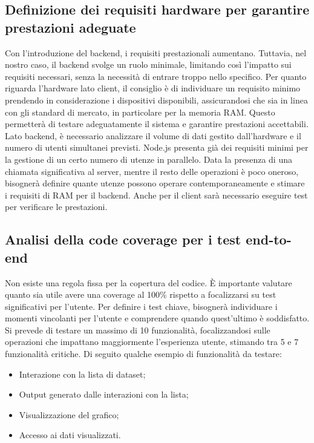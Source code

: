 \subsection{Definizione dei requisiti hardware per garantire prestazioni adeguate}
Con l'introduzione del backend, i requisiti prestazionali aumentano. Tuttavia, nel nostro caso, il backend svolge un ruolo minimale, limitando così l'impatto sui requisiti necessari, senza la necessità di entrare troppo nello specifico.
Per quanto riguarda l'hardware lato client, il consiglio è di individuare un requisito minimo prendendo in considerazione i dispositivi disponibili, assicurandosi che sia in linea con gli standard di mercato, in particolare per la memoria RAM. Questo permetterà di testare adeguatamente il sistema e garantire prestazioni accettabili.
Lato backend, è necessario analizzare il volume di dati gestito dall'hardware e il numero di utenti simultanei previsti. Node.js presenta già dei requisiti minimi per la gestione di un certo numero di utenze in parallelo. Data la presenza di una chiamata significativa al server, mentre il resto delle operazioni è poco oneroso, bisognerà definire quante utenze possono operare contemporaneamente e stimare i requisiti di RAM per il backend. Anche per il client sarà necessario eseguire test per verificare le prestazioni.

\subsection{Analisi della code coverage per i test end-to-end}
Non esiste una regola fissa per la copertura del codice. È importante valutare quanto sia utile avere una coverage al 100\% rispetto a focalizzarsi su test significativi per l'utente.
Per definire i test chiave, bisognerà individuare i momenti vincolanti per l'utente e comprendere quando quest'ultimo è soddisfatto. Si prevede di testare un massimo di 10 funzionalità, focalizzandosi sulle operazioni che impattano maggiormente l'esperienza utente, stimando tra 5 e 7 funzionalità critiche.
Di seguito qualche esempio di funzionalità da testare:
\begin{itemize}
\item Interazione con la lista di dataset;
\item Output generato dalle interazioni con la lista;
\item Visualizzazione del grafico;
\item Accesso ai dati visualizzati.
\end{itemize}

